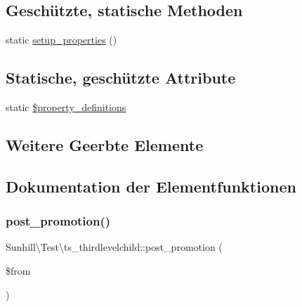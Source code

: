 \subsection*{Geschützte, statische Methoden}
\begin{DoxyCompactItemize}
\item 
static \hyperlink{classSunhill_1_1Test_1_1ts__thirdlevelchild_a7d5f47a8722ff45527124a4265e197cd}{setup\+\_\+properties} ()
\end{DoxyCompactItemize}
\subsection*{Statische, geschützte Attribute}
\begin{DoxyCompactItemize}
\item 
static \hyperlink{classSunhill_1_1Test_1_1ts__thirdlevelchild_ad7ec0fea715db7421edd226283f47d56}{\$property\+\_\+definitions}
\end{DoxyCompactItemize}
\subsection*{Weitere Geerbte Elemente}


\subsection{Dokumentation der Elementfunktionen}
\mbox{\label{classSunhill_1_1Test_1_1ts__thirdlevelchild_a989c880f7f1c301b9d988b0533850d76}} 
\subsubsection{\texorpdfstring{post\+\_\+promotion()}{post\_promotion()}}
{\footnotesize\ttfamily Sunhill\textbackslash{}\+Test\textbackslash{}ts\+\_\+thirdlevelchild\+::post\+\_\+promotion (\begin{DoxyParamCaption}\item[{}]{\$from }\end{DoxyParamCaption})}

\mbox{\label{classSunhill_1_1Test_1_1ts__thirdlevelchild_a7d5f47a8722ff45527124a4265e197cd}} 
